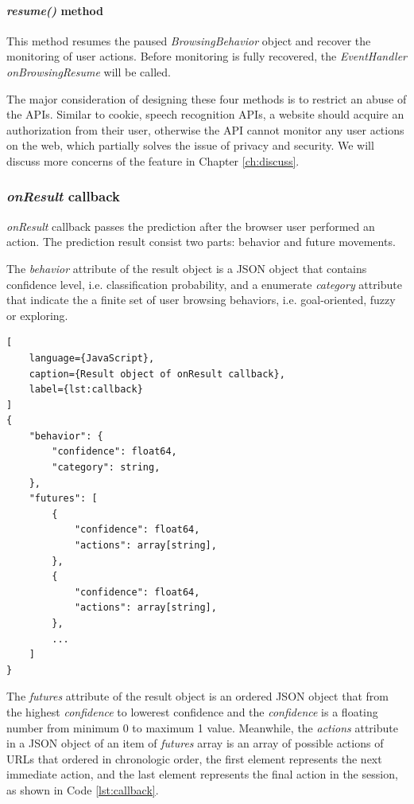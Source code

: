 \paragraph{\emph{resume()} method} This method resumes the paused \emph{BrowsingBehavior}
object and recover the monitoring of user actions. Before monitoring is fully recovered,
the \emph{EventHandler onBrowsingResume} will be called.

The major consideration of designing these four methods is to restrict an abuse of the APIs.
Similar to cookie, speech recognition APIs, a website should acquire an authorization from
their user, otherwise the API cannot monitor any user actions on the web, which partially
solves the issue of privacy and security. We will discuss more concerns of the feature in
Chapter \ref{ch:discuss}.

\subsubsection{\emph{onResult} callback}

\emph{onResult} callback passes the prediction after the browser user performed an action.
The prediction result consist two parts: behavior and future movements.

The \emph{behavior} attribute of the result object is a JSON object that contains 
confidence level, i.e. classification probability, and a enumerate \emph{category} attribute
that indicate the a finite set of user browsing behaviors, i.e. goal-oriented, fuzzy or exploring.

\begin{lstlisting}[
    language={JavaScript},
    caption={Result object of onResult callback},
    label={lst:callback}
]
{
    "behavior": {
        "confidence": float64,
        "category": string,
    },
    "futures": [
        {
            "confidence": float64,
            "actions": array[string],
        },
        {
            "confidence": float64,
            "actions": array[string],
        },
        ...
    ]
}
\end{lstlisting}

The \emph{futures} attribute of the result object is an ordered JSON object that from the
highest \emph{confidence} to lowerest {confidence} and the \emph{confidence} is a floating
number from minimum 0 to maximum 1 value. Meanwhile, the \emph{actions} attribute in a 
JSON object of an item of \emph{futures} array is an array of possible actions of URLs that
ordered in chronologic order, the first element represents the next immediate action,
and the last element represents the final action in the session, as shown in Code \ref{lst:callback}.


